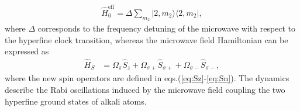 \documentclass[%
reprint,
 amsmath,amssymb,
 aps,
floatfix,
]{revtex4-1}
\newcommand{\TF}[2][magenta]{\textcolor{#1}{\textit{TF: #2}}}
\begin{document}

\begin{align}
 \hat{H}_{0}^{\mathrm{eff}} =\Delta \sum_{m_2} |2, m_2\rangle \langle 2, m_2|,
\end{align}
where $\Delta$ corresponds to the frequency detuning of the microwave with respect to the hyperfine clock transition, whereas the microwave field Hamiltonian can be expressed as
\begin{align}
\hat{H}_{S}&=\Omega_\pi \hat{S}_z +\Omega_{\sigma+} \hat{S}_{\sigma+}+\Omega_{\sigma-} \hat{S}_{\sigma-},
\end{align}
where the new spin operators are defined in eqs.(\ref{eq:Sz}-\ref{eq:Sn}).
The dynamics describe the Rabi oscillations induced by the microwave field coupling the two hyperfine ground states of alkali atoms.
\end{document}
